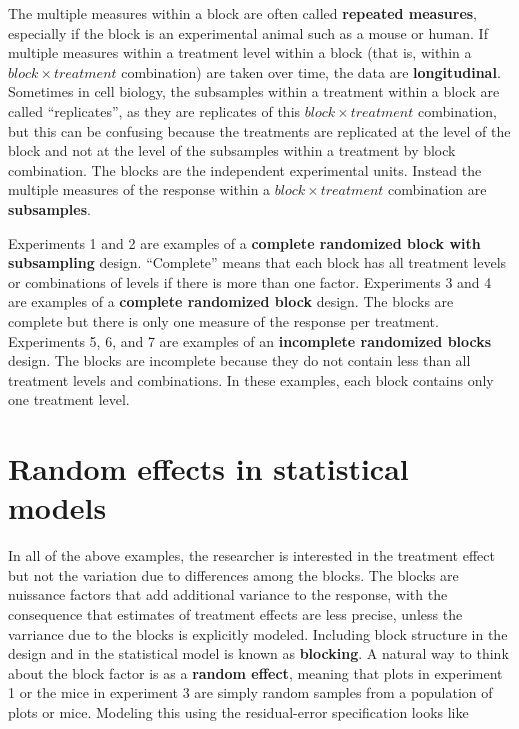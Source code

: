 \documentclass[]{book}
\begin{document}
The multiple measures within a block are often called \textbf{repeated
measures}, especially if the block is an experimental animal such as a
mouse or human. If multiple measures within a treatment level within a
block (that is, within a \(block \times treatment\) combination) are
taken over time, the data are \textbf{longitudinal}. Sometimes in cell
biology, the subsamples within a treatment within a block are called
``replicates'', as they are replicates of this
\(block \times treatment\) combination, but this can be confusing
because the treatments are replicated at the level of the block and not
at the level of the subsamples within a treatment by block combination.
The blocks are the independent experimental units. Instead the multiple
measures of the response within a \(block \times treatment\) combination
are \textbf{subsamples}.

Experiments 1 and 2 are examples of a \textbf{complete randomized block
with subsampling} design. ``Complete'' means that each block has all
treatment levels or combinations of levels if there is more than one
factor. Experiments 3 and 4 are examples of a \textbf{complete
randomized block} design. The blocks are complete but there is only one
measure of the response per treatment. Experiments 5, 6, and 7 are
examples of an \textbf{incomplete randomized blocks} design. The blocks
are incomplete because they do not contain less than all treatment
levels and combinations. In these examples, each block contains only one
treatment level.

\section{Random effects in statistical
models}\label{random-effects-in-statistical-models}

In all of the above examples, the researcher is interested in the
treatment effect but not the variation due to differences among the
blocks. The blocks are nuissance factors that add additional variance to
the response, with the consequence that estimates of treatment effects
are less precise, unless the varriance due to the blocks is explicitly
modeled. Including block structure in the design and in the statistical
model is known as \textbf{blocking}. A natural way to think about the
block factor is as a \textbf{random effect}, meaning that plots in
experiment 1 or the mice in experiment 3 are simply random samples from
a population of plots or mice. Modeling this using the residual-error
specification looks like
\end{document}
